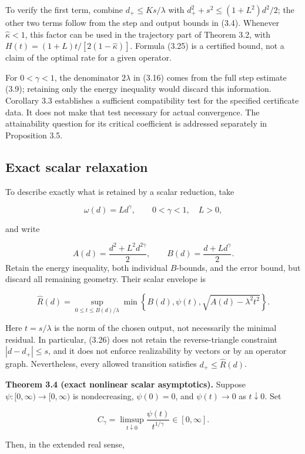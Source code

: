 \documentclass[11pt,a4paper]{article}
\theoremstyle{plain}
\theoremstyle{definition}
\theoremstyle{remark}
\begin{document}
To verify the first term, combine \(d_+\le Ks/\lambda\) with
\(d_+^2+s^2\le(1+L^2)d^2/2\); the other two terms follow from the step
and output bounds in (3.4). Whenever \(\widehat\kappa<1\), this factor
can be used in the trajectory part of Theorem 3.2, with
\(H(t)=(1+L)t/[2(1-\widehat\kappa)]\). Formula (3.25) is a certified
bound, not a claim of the optimal rate for a given operator.

For \(0<\gamma<1\), the denominator \(2\lambda\) in (3.16) comes from
the full step estimate (3.9); retaining only the energy inequality would
discard this information. Corollary 3.3 establishes a sufficient
compatibility test for the specified certificate data. It does not make
that test necessary for actual convergence. The attainability question
for its critical coefficient is addressed separately in Proposition 3.5.

\hypertarget{exact-scalar-relaxation}{%
\subsection{Exact scalar
relaxation}\label{exact-scalar-relaxation}}

To describe exactly what is retained by a scalar reduction, take

\[
\omega(d)=Ld^\gamma,\qquad 0<\gamma<1,\quad L>0,
\]

and write

\[
A(d)=\frac{d^2+L^2d^{2\gamma}}2,
\qquad
B(d)=\frac{d+Ld^\gamma}2.
\] Retain the energy inequality, both individual \(B\)-bounds, and the
error bound, but discard all remaining geometry. Their scalar envelope
is

\[
\widehat R(d)
=\sup_{0\le t\le B(d)/\lambda}
\min\left\{B(d),\psi(t),\sqrt{A(d)-\lambda^2t^2}\right\}.
\tag{3.26}
\]

Here \(t=s/\lambda\) is the norm of the chosen output, not necessarily
the minimal residual. In particular, (3.26) does not retain the
reverse-triangle constraint \(|d-d_+|\le s\), and it does not enforce
realizability by vectors or by an operator graph. Nevertheless, every
allowed transition satisfies \(d_+\le\widehat R(d)\).

\textbf{Theorem 3.4 (exact nonlinear scalar asymptotics).} Suppose
\(\psi:[0,\infty)\to[0,\infty)\) is nondecreasing, \(\psi(0)=0\), and
\(\psi(t)\to0\) as \(t\downarrow0\). Set

\[
C_\gamma=\limsup_{t\downarrow0}\frac{\psi(t)}{t^{1/\gamma}}\in[0,\infty].
\]

Then, in the extended real sense,
\end{document}
